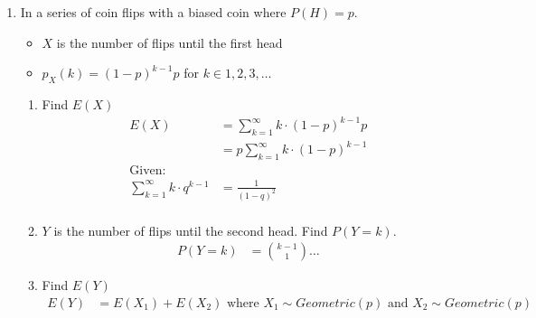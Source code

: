 \documentclass[12pt]{article}
\begin{document}
\begin{enumerate}
\begin{itemize}
\begin{tabular}{|c|c|c|}
                \end{tabular}
            \end{itemize}
            \item In a series of coin flips with a biased coin where $P(H) = p$.
            \begin{itemize}
                \item $X$ is the number of flips until the first head
                \item $p_X(k) = {(1-p)}^{k-1}p$ for $k \in {1, 2, 3, \ldots}$
            \end{itemize}
            \begin{enumerate}
                \item Find $E(X)$
                \begin{align*}
                    E(X) &= \sum_{k=1}^{\infty} k \cdot {(1-p)}^{k-1}p \\
                    &= p \sum_{k=1}^{\infty} k \cdot {(1-p)}^{k-1} \\
                    \text{Given: } \\
                    \sum_{k=1}^{\infty} k \cdot q^{k-1} &= \frac{1}{{(1-q)}^2} \\
                \end{align*}
                \item $Y$ is the number of flips until the second head. Find $P(Y = k)$.
                \begin{align*}
                    P(Y = k) &= \binom{k-1}{1} \ldots
                \end{align*}
                \item Find $E(Y)$
                \begin{align*}
                    E(Y) &= E(X_1) + E(X_2) \text{ where } X_1 \sim Geometric(p) \text{ and } X_2 \sim Geometric(p)
                \end{align*}
            \end{enumerate}
        \end{enumerate}
\end{document}
